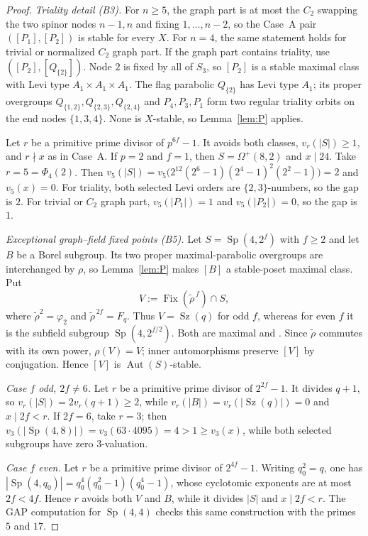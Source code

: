 \documentclass[11pt]{amsart}
\theoremstyle{definition}
\theoremstyle{remark}
\DeclareMathOperator{\Aut}{Aut}
\DeclareMathOperator{\Fix}{Fix}
\DeclareMathOperator{\Sp}{Sp}
\DeclareMathOperator{\Sz}{Sz}
\newcommand{\vp}[1]{v_{#1}}
\begin{document}
\begin{proof}
\emph{Triality detail (B3).}
For $n\geq5$, the graph part is at most the $C_2$ swapping the two spinor
nodes $n{-}1,n$ and fixing $1,\dots,n{-}2$, so the Case~A pair
$([P_1],[P_2])$ is stable for every $X$. For $n=4$, the same statement
holds for trivial or normalized $C_2$ graph part. If the graph part contains
triality, use $([P_2],[Q_{\{2\}}])$. Node $2$ is fixed by all of $S_3$, so
$[P_2]$ is a stable maximal class with Levi type
$A_1{\times}A_1{\times}A_1$. The flag parabolic $Q_{\{2\}}$ has Levi type
$A_1$; its proper overgroups
$Q_{\{1,2\}},Q_{\{2,3\}},Q_{\{2,4\}}$ and $P_4,P_3,P_1$ form two regular
triality orbits on the end nodes $\{1,3,4\}$. None is $X$-stable, so
Lemma~\ref{lem:P} applies.

Let $r$ be a primitive prime divisor of $p^{6f}-1$. It avoids both classes,
$\vp{r}(|S|)\geq1$, and $r\nmid x$ as in Case~A. If $p=2$ and $f=1$, then
$S=\Omega^+(8,2)$ and $x\mid24$. Take $r=5=\Phi_4(2)$. Then
$\vp{5}(|S|)=\vp{5}\bigl(2^{12}(2^6-1)(2^4-1)^2(2^2-1)\bigr)=2$
and $\vp{5}(x)=0$.
For triality, both selected Levi orders are $\{2,3\}$-numbers, so the gap is
$2$. For trivial or $C_2$ graph part, $\vp{5}(|P_1|)=1$ and
$\vp{5}(|P_2|)=0$, so the gap is $1$.

\emph{Exceptional graph--field fixed points (B5).}
Let $S=\Sp(4,2^f)$ with $f\geq2$ and let $B$ be a Borel subgroup. Its two
proper maximal-parabolic overgroups are interchanged by $\rho$, so
Lemma~\ref{lem:P} makes $[B]$ a stable-poset maximal class. Put
\[
 V:=\Fix(\widetilde\rho^{\,f})\cap S,
\]
where $\widetilde\rho^2=\varphi_2$ and
$\widetilde\rho^{\,2f}=F_q$. Thus $V=\Sz(q)$ for odd $f$, whereas for even
$f$ it is the subfield subgroup $\Sp(4,2^{f/2})$. Both are maximal
\cite[Table~8.14, p.~384]{BHRD} and \cite{Suzuki1962}. Since
$\widetilde\rho$ commutes with its own power, $\rho(V)=V$; inner
automorphisms preserve $[V]$ by conjugation. Hence $[V]$ is
$\Aut(S)$-stable.

\emph{Case $f$ odd, $2f\neq6$.} Let $r$ be a primitive prime divisor of $2^{2f}-1$.
It divides $q+1$, so
$\vp{r}(|S|)=2\vp{r}(q+1)\geq2$, while
$\vp{r}(|B|)=\vp{r}(|\Sz(q)|)=0$ and $x\mid2f<r$. If $2f=6$, take
$r=3$; then $\vp{3}(|\Sp(4,8)|)=\vp{3}(63\cdot4095)=4>1\geq\vp{3}(x)$,
while both selected subgroups have zero $3$-valuation.

\emph{Case $f$ even.} Let $r$ be a primitive prime divisor of $2^{4f}-1$.
Writing $q_0^2=q$, one has
$|\Sp(4,q_0)|=q_0^4(q_0^2-1)(q_0^4-1)$, whose cyclotomic exponents are at
most $2f<4f$. Hence $r$ avoids both $V$ and $B$, while it divides $|S|$
and $x\mid2f<r$. The GAP computation for $\Sp(4,4)$ checks this same
construction with the primes $5$ and $17$.


\end{proof}
\end{document}
